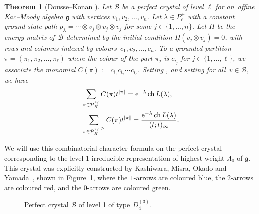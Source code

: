 \documentclass[10pt,a4paper]{amsart}
\numberwithin{equation}{section}
\newtheorem{Theorem}{Theorem}[section]
\theoremstyle{definition}
\begin{document}
\begin{Theorem}[{Dousse--Konan \cite[Theorem~1.9]{DK19b}}]\label{thm:KMN2coloured}
Let $\mathcal{B}$ be a perfect crystal of level $\ell$ for an~affine Kac--Moody algebra $\mathfrak{g}$ with vertices $v_1,v_2,\ldots,v_n$. Let $\lambda \in P^+_\ell$ with a constant ground state path $p_\lambda = \cdots \otimes v_j \otimes v_j \otimes v_j$ for some $j\in\{1,\ldots,n\}$. Let $H$ be the energy matrix of~$\mathcal{B}$ determined by the initial condition $H(v_j\otimes v_j)=0$, with rows and columns indexed by colours~${c_1,c_2,\ldots,c_n}$. To a grounded partition $\pi=(\pi_1,\pi_2,\ldots,\pi_\ell)$ where the colour of the part $\pi_j$ is $c_{i_j}$ for $j\in\{1,\ldots,\ell\}$, we associate the monomial $C(\pi):= c_{i_1}c_{i_2} \cdots  c_{i_\ell}$.
Setting , and setting  for all~${v \in \mathcal{B}}$, we have
\begin{align}
&\sum_{\pi \in \mathcal{P}_{H}^{c_j}} C(\pi) t^{|\pi|}= {\rm e}^{-\lambda} \operatorname{ch}L(\lambda),\label{eq:grounded_char}\\
&\sum_{\pi \in \mathcal{P}_{H}^{c_j,\geq}} C(\pi) t^{|\pi|}= \frac{{\rm e}^{-\lambda} \operatorname{ch}L(\lambda)}{(t;t)_\infty}\label{eq:geq_grounded_char}.
\end{align}
\end{Theorem}

We will use this combinatorial character formula on the perfect crystal corresponding to the level 1 irreducible representation of highest weight $\Lambda_0$ of $\mathfrak{g}$. This crystal was explicitly constructed by Kashiwara, Misra, Okado and Yamada~\cite{KMOY07}, shown in Figure~\ref{fig:G2perfectcrystal}, where the $1$\nobreakdash-arrows are coloured blue, the $2$-arrows are coloured red, and the $0$-arrows are coloured green.

\begin{figure}[!t]
 \centering
 \caption{Perfect crystal $\mathcal{B}$ of level 1 of type $D_4^{(3)}$.} \label{fig:G2perfectcrystal}
\end{figure}
\end{document}
